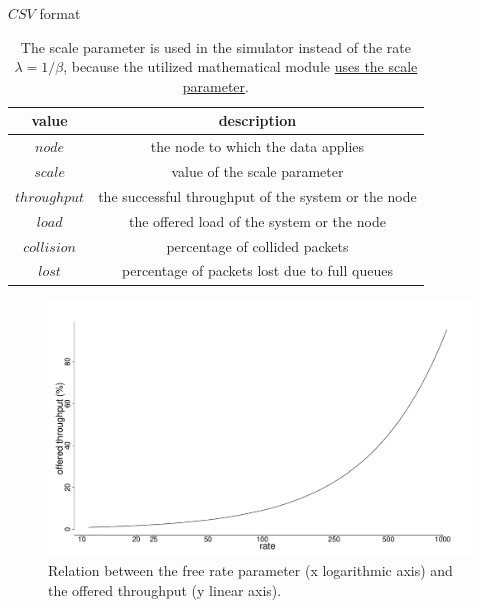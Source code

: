 \documentclass[conference]{IEEEtran}
\begin{document}
\begin{table}
    \centering
    \caption{\(CSV\) format}
    \label{tab:csvformat}
    \begin{tabular}{c|c}
        \toprule
        value & description \\
        \midrule
        \(node\) & the node to which the data applies \\
        \(scale\) & value of the scale parameter \\
        \(throughput\) & the successful throughput of the system or the node \\
        \(load\) & the offered load of the system or the node \\
        \(collision\) & percentage of collided packets \\
        \(lost\) & percentage of packets lost due to full queues \\
        \bottomrule
    \end{tabular}
    \caption{The scale parameter is used in the simulator instead of the rate \(\lambda=1/\beta\), because the utilized mathematical module \href{https://docs.scipy.org/doc/numpy-1.13.0/reference/generated/numpy.random.exponential.html}{uses the scale parameter}.}
\end{table}

\begin{figure}[t]
    \centering
    \includegraphics[width=\columnwidth]{graphs/Sim1}
    \caption{Relation between the free rate parameter (x logarithmic axis) and the offered throughput (y linear axis).}
    \label{grph:sim1}
\end{figure}
\end{document}
